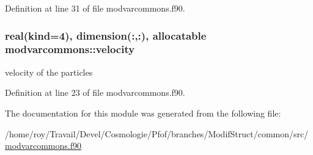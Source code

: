 Definition at line 31 of file modvarcommons.\-f90.

\hypertarget{classmodvarcommons_a7671f66edc6e99da11ea2ee4c246e033}{
\subsubsection[{velocity}]{\setlength{\rightskip}{0pt plus 5cm}real(kind=4), dimension(\-:,\-:), allocatable modvarcommons\-::velocity}}\label{classmodvarcommons_a7671f66edc6e99da11ea2ee4c246e033}


velocity of the particles 



Definition at line 23 of file modvarcommons.\-f90.



The documentation for this module was generated from the following file\-:\begin{DoxyCompactItemize}
\item 
/home/roy/\-Travail/\-Devel/\-Cosmologie/\-Pfof/branches/\-Modif\-Struct/common/src/\hyperlink{modvarcommons_8f90}{modvarcommons.\-f90}\end{DoxyCompactItemize}
